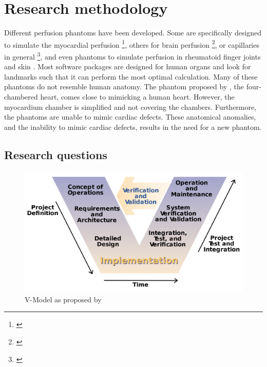 \chapter{Research methodology}
\label{ch:res_metho}

Different perfusion phantoms have been developed. Some are specifically designed to simulate the myocardial perfusion \footnote{\citep{chiribiri2013perfusion, otton2013direct, o2017effect, o2017feasibility, teslow1991x}}, others for brain perfusion \footnote{\citep{hashimoto2018effect, suzuki2017quantitative, boese2013performance, mathys2012phantom, ebrahimi2010microfabricated, wang2010flow, noguchi2007quantitative, ganguly2012vitro, klotz1999perfusion}}, or capillaries in general \footnote{\citep{kim2016efficiency, anderson2011semipermeable, driscoll2011development, gauthier2011perfusion, veltmann2002design, lohmaier2004vitro}}, and even phantoms to simulate perfusion in rheumatoid finger joints \citep{sakano2015power} and skin \citep{kim2018multidimensional}. Most software packages are designed for human organs and look for landmarks such that it can perform the most optimal calculation. Many of these phantoms do not resemble human anatomy. The phantom proposed by \cite{chiribiri2013perfusion}, the four-chambered heart, comes close to mimicking a human heart. However, the myocardium chamber is simplified and not covering the chambers. Furthermore, the phantoms are unable to mimic cardiac defects. These anatomical anomalies, and the inability to mimic cardiac defects,  results in the need for a new phantom.

\section{Research questions}
\begin{figure}[b!]
	\begin{center}
		\includegraphics[width=0.5\linewidth]{images/vmodel.png}
	\end{center}
	\caption{V-Model\citep{rook1986controlling} as proposed by \cite{osborne2005clarus}}
	\label{fig:vmodel}
\end{figure}

